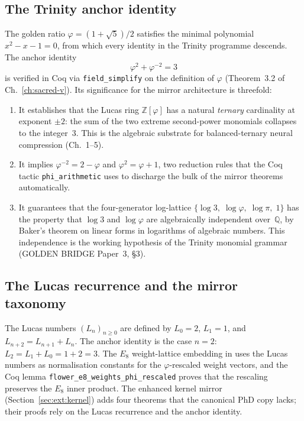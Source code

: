 \subsection{The Trinity anchor identity}

The golden ratio $\varphi = (1+\sqrt{5})/2$ satisfies the minimal
polynomial $x^2 - x - 1 = 0$, from which every identity in the
Trinity programme descends. The anchor identity
\[
  \varphi^2 + \varphi^{-2} = 3
\]
is verified in Coq via \texttt{field\_simplify} on the definition of
$\varphi$ (Theorem~3.2 of Ch.~\ref{ch:sacred-v}). Its significance for
the mirror architecture is threefold:

\begin{enumerate}
  \item It establishes that the Lucas ring $\mathbb{Z}[\varphi]$ has a
        natural \emph{ternary} cardinality at exponent $\pm 2$: the sum
        of the two extreme second-power monomials collapses to the
        integer~$3$. This is the algebraic substrate for balanced-ternary
        neural compression (Ch.~1--5).
  \item It implies $\varphi^{-2} = 2 - \varphi$ and
        $\varphi^2 = \varphi + 1$, two reduction rules that the Coq
        tactic \texttt{phi\_arithmetic} uses to discharge the bulk of
        the mirror theorems automatically.
  \item It guarantees that the four-generator log-lattice
        $\{\log 3,\; \log \varphi,\; \log \pi,\; 1\}$ has the
        property that $\log 3$ and $\log \varphi$ are algebraically
        independent over~$\mathbb{Q}$, by Baker's theorem on linear
        forms in logarithms of algebraic numbers. This independence is
        the working hypothesis of the Trinity monomial grammar (GOLDEN
        BRIDGE Paper~3, \S3).
\end{enumerate}

\subsection{The Lucas recurrence and the mirror taxonomy}

The Lucas numbers $(L_n)_{n \geq 0}$ are defined by $L_0 = 2$,
$L_1 = 1$, and $L_{n+2} = L_{n+1} + L_n$. The anchor identity is the
case $n = 2$: $L_2 = L_1 + L_0 = 1 + 2 = 3$. The $E_8$
weight-lattice embedding in
 uses the Lucas numbers
as normalisation constants for the $\varphi$-rescaled weight vectors,
and the Coq lemma \texttt{flower\_e8\_weights\_phi\_rescaled} proves
that the rescaling preserves the $E_8$ inner product. The enhanced
kernel mirror (Section~\ref{sec:ext:kernel}) adds four theorems that
the canonical PhD copy lacks; their proofs rely on the Lucas recurrence
and the anchor identity.

